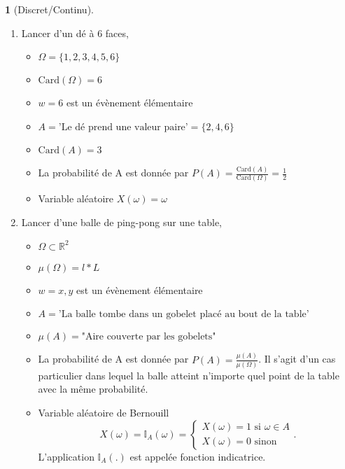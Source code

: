 \documentclass[8pt,notheorems]{beamer}
\theoremstyle{definition}
\theoremstyle{example}
\newtheorem{example}{\translate{Example}}
\theoremstyle{mystyle}
\theoremstyle{plain}
\begin{document}
\begin{frame}
\begin{example}[Discret/Continu]
\begin{enumerate}
\item Lancer d'un dé à $6$ faces,
\begin{itemize}
\item $\Omega=\{1,2,3,4,5,6\}$
\item $\text{Card}(\Omega)=6$
\item $w={6}$ est un évènement élémentaire
\item $A = \text{'Le dé prend une valeur paire'}=\{2,4,6\}$
\item $\text{Card}(A)=3$
\item La probabilité de A est donnée par $P(A)=\frac{\text{Card}(A)}{\text{Card}(\Omega)}=\frac{1}{2}$
\item Variable aléatoire $X(\omega)=\omega$
\end{itemize}
\item Lancer d'une balle de ping-pong sur une table,
\begin{itemize}
\item $\Omega\subset\mathbb{R}^{2}$
\item $\mu(\Omega)=l*L$
\item $w={x,y}$ est un évènement élémentaire
\item $A = \text{'La balle tombe dans un gobelet placé au bout de la table'}$
\item $\mu(A)=\text{"Aire couverte par les gobelets"}$
\item La probabilité de A est donnée par $P(A)=\frac{\mu(A)}{\mu(\Omega)}$. Il s'agit d'un cas particulier dans lequel la balle atteint n'importe quel point de la table avec la même probabilité.
\item Variable aléatoire de Bernouill
$$X(\omega)=\mathbb{I}_A(\omega)=\begin{cases}
X(\omega)=1\text{ si }\omega\in A\\
X(\omega)=0\text{ sinon}
\end{cases}.
$$
L'application $\mathbb{I}_A(.)$ est appelée fonction indicatrice.
\end{itemize}
\end{enumerate}
\end{example}
\end{frame}
\end{document}
